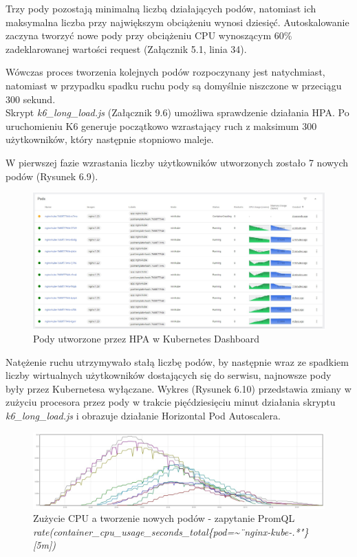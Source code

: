 
Trzy pody pozostają minimalną liczbą działających podów, natomiast ich maksymalna liczba przy największym obciążeniu wynosi dziesięć. Autoskalowanie zaczyna tworzyć nowe pody przy obciążeniu CPU wynoszącym 60\% zadeklarowanej wartości request (Załącznik 5.1, linia 34). 

Wówczas proces tworzenia kolejnych podów rozpoczynany jest natychmiast, natomiast w przypadku spadku ruchu pody są domyślnie niszczone w przeciągu 300 sekund.\\

Skrypt \textit{k6\_long\_load.js} (Załącznik 9.6) umożliwa sprawdzenie działania HPA. Po uruchomieniu K6 generuje początkowo wzrastający ruch z maksimum 300 użytkowników, który następnie stopniowo maleje.

W pierwszej fazie wzrastania liczby użytkowników utworzonych zostało 7 nowych podów (Rysunek 6.9).

\begin{figure}[H]
    \centering
    \includegraphics[width=1\textwidth]{img/hpa.jpg}
    \caption{Pody utworzone przez HPA w Kubernetes Dashboard}
\end{figure}
\newpage

Natężenie ruchu utrzymywało stałą liczbę podów, by następnie wraz ze spadkiem liczby wirtualnych użytkowników dostających się do serwisu, najnowsze pody były przez Kubernetesa wyłączane. Wykres (Rysunek 6.10) przedstawia zmiany w zużyciu procesora przez pody w trakcie pięćdziesięciu minut działania skryptu \textit{k6\_long\_load.js} i obrazuje działanie Horizontal Pod Autoscalera. 

\begin{figure}[H]
    \centering
    \includegraphics[width=1\textwidth]{img/hpa_d.jpg}
    \caption{Zużycie CPU a tworzenie nowych podów - zapytanie PromQL \textit{rate(container\_cpu\_usage\_seconds\_total\{pod=\textasciitilde \"\ nginx-kube-.*"\}[5m])}}
\end{figure}



